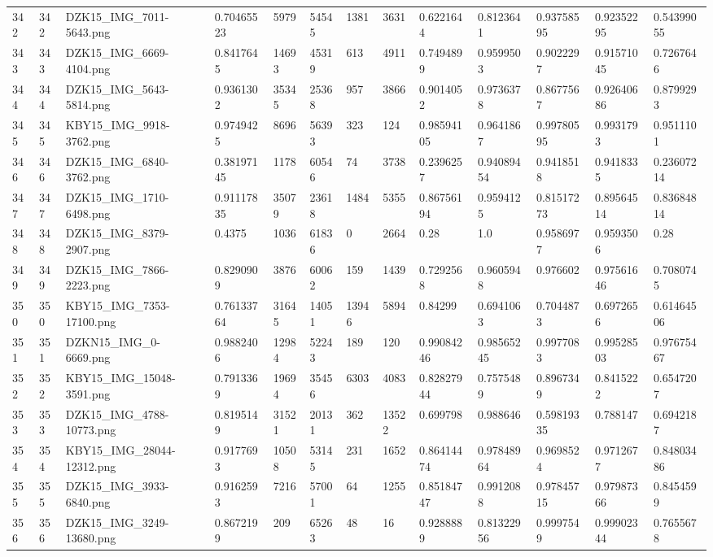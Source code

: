 \documentclass[11pt, a4paper, twoside]{report}
\begin{document}
\begin{longtable}[c]{@{}lllllllllllll@{}}
342 & 342 & DZK15\_IMG\_7011-5643.png & 0.70465523 & 5979 & 54545 & 1381 & 3631 & 0.6221644 & 0.8123641 & 0.93758595 & 0.92352295 & 0.54399055 \\
343 & 343 & DZK15\_IMG\_6669-4104.png & 0.8417645 & 14693 & 45319 & 613 & 4911 & 0.7494899 & 0.9599503 & 0.9022297 & 0.91571045 & 0.7267646 \\
344 & 344 & DZK15\_IMG\_5643-5814.png & 0.9361302 & 35345 & 25368 & 957 & 3866 & 0.9014052 & 0.9736378 & 0.8677567 & 0.92640686 & 0.8799293 \\
345 & 345 & KBY15\_IMG\_9918-3762.png & 0.9749425 & 8696 & 56393 & 323 & 124 & 0.98594105 & 0.9641867 & 0.99780595 & 0.9931793 & 0.9511101 \\
346 & 346 & DZK15\_IMG\_6840-3762.png & 0.38197145 & 1178 & 60546 & 74 & 3738 & 0.2396257 & 0.94089454 & 0.9418518 & 0.9418335 & 0.23607214 \\
347 & 347 & DZK15\_IMG\_1710-6498.png & 0.91117835 & 35079 & 23618 & 1484 & 5355 & 0.86756194 & 0.9594125 & 0.81517273 & 0.89564514 & 0.83684814 \\
348 & 348 & DZK15\_IMG\_8379-2907.png & 0.4375 & 1036 & 61836 & 0 & 2664 & 0.28 & 1.0 & 0.9586977 & 0.9593506 & 0.28 \\
349 & 349 & DZK15\_IMG\_7866-2223.png & 0.8290909 & 3876 & 60062 & 159 & 1439 & 0.7292568 & 0.9605948 & 0.976602 & 0.97561646 & 0.7080745 \\
350 & 350 & KBY15\_IMG\_7353-17100.png & 0.76133764 & 31645 & 14051 & 13946 & 5894 & 0.84299 & 0.6941063 & 0.7044873 & 0.6972656 & 0.61464506 \\
351 & 351 & DZKN15\_IMG\_0-6669.png & 0.9882406 & 12984 & 52243 & 189 & 120 & 0.99084246 & 0.98565245 & 0.9977083 & 0.99528503 & 0.97675467 \\
352 & 352 & KBY15\_IMG\_15048-3591.png & 0.7913369 & 19694 & 35456 & 6303 & 4083 & 0.82827944 & 0.7575489 & 0.8967349 & 0.8415222 & 0.6547207 \\
353 & 353 & DZK15\_IMG\_4788-10773.png & 0.8195149 & 31521 & 20131 & 362 & 13522 & 0.699798 & 0.988646 & 0.59819335 & 0.788147 & 0.6942187 \\
354 & 354 & KBY15\_IMG\_28044-12312.png & 0.9177693 & 10508 & 53145 & 231 & 1652 & 0.86414474 & 0.97848964 & 0.9698524 & 0.9712677 & 0.84803486 \\
355 & 355 & DZK15\_IMG\_3933-6840.png & 0.9162593 & 7216 & 57001 & 64 & 1255 & 0.85184747 & 0.9912088 & 0.97845715 & 0.97987366 & 0.8454599 \\
356 & 356 & DZK15\_IMG\_3249-13680.png & 0.8672199 & 209 & 65263 & 48 & 16 & 0.9288889 & 0.81322956 & 0.9997549 & 0.99902344 & 0.7655678 \\

\end{longtable}
\end{document}
